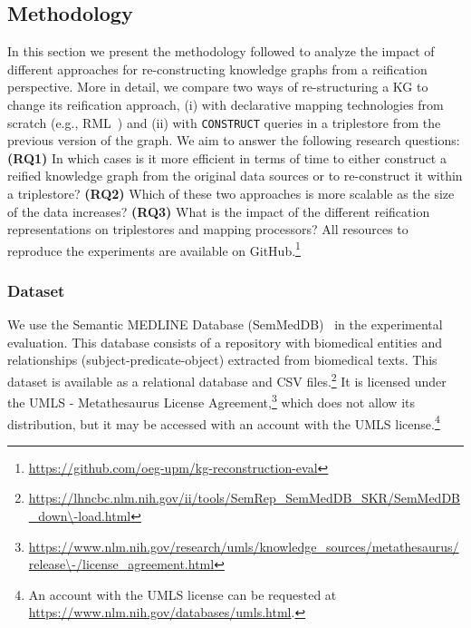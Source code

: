 \subsection{Methodology}
\label{sec:chp6-1_methodology}

In this section we present the methodology followed to analyze the impact of different approaches for re-constructing knowledge graphs from a reification perspective. More in detail, we compare two ways of re-structuring a KG to change its reification approach, (i) with declarative mapping technologies from scratch (e.g., RML~\citep{iglesias2023rml}) and (ii) with \texttt{CONSTRUCT} queries in a triplestore from the previous version of the graph. We aim to answer the following research questions: 
\textbf{(RQ1)} In which cases is it more efficient in terms of time to either construct a reified knowledge graph from the original data sources or to re-construct it within a triplestore?
\textbf{(RQ2)} Which of these two approaches is more scalable as the size of the data increases?
\textbf{(RQ3)} What is the impact of the different reification representations on triplestores and mapping processors?
All resources to reproduce the experiments are available on GitHub.\footnote{\url{https://github.com/oeg-upm/kg-reconstruction-eval}}



\subsubsection{Dataset}
\label{sec:chp6-1_dataset}


We use the Semantic MEDLINE Database (SemMedDB)~\citep{SemMedDB2012} in the experimental evaluation. This database consists of a repository with biomedical entities and relationships (subject-predicate-object) extracted from biomedical texts.
This dataset is available as a relational database and CSV files.\footnote{\url{https://lhncbc.nlm.nih.gov/ii/tools/SemRep\_SemMedDB\_SKR/SemMedDB\_down\-load.html}}
It is licensed under the UMLS - Metathesaurus License Agreement,\footnote{\url{https://www.nlm.nih.gov/research/umls/knowledge\_sources/metathesaurus/release\-/license\_agreement.html}} which does not allow its distribution, but it may be accessed with an account with the UMLS license.\footnote{An account with the UMLS license can be requested at \url{https://www.nlm.nih.gov/databases/umls.html}.}


